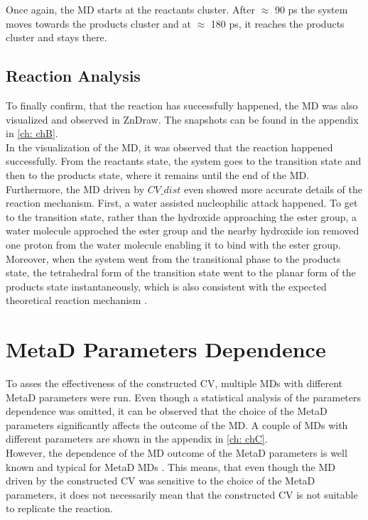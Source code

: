 Once again, the MD starts at the reactants cluster.
After $\approx$ 90 ps the system moves towards the products cluster and at $\approx$ 180 ps, it reaches the products cluster and stays there.

\subsection{Reaction Analysis}
To finally confirm, that the reaction has successfully happened, the MD was also visualized and observed in ZnDraw.
The snapshots can be found in the appendix in \cref{ch: chB}. \\

In the visualization of the MD, it was observed that the reaction happened successfully.
From the reactants state, the system goes to the transition state and then to the products state, where it remains until the end of the MD.
Furthermore, the MD driven by $CV\_dist$ even showed more accurate details of the reaction mechanism.
First, a water assisted nucleophilic attack happened. To get to the transition state, rather than the hydroxide approaching the ester group, 
a water molecule approched the ester group and the nearby hydroxide ion removed one proton from the water molecule enabling it to bind with the ester group.
Moreover, when the system went from the transitional phase to the products state, the tetrahedral form of the transition state went to the planar form of the products state instantaneously, which is also consistent with the expected theoretical reaction mechanism \cite{Clayden2012}.

\newpage

\section{MetaD Parameters Dependence}

To asses the effectiveness of the constructed CV, multiple MDs with different MetaD parameters were run.
Even though a statistical analysis of the parameters dependence was omitted, it can be observed that the choice of the MetaD parameters significantly affects the outcome of the MD.
A couple of MDs with different parameters are shown in the appendix in \cref{ch: chC}. \\
However, the dependence of the MD outcome of the MetaD parameters is well known and typical for MetaD MDs \cite{Laio2008}.
This means, that even though the MD driven by the constructed CV was sensitive to the choice of the MetaD parameters, it does not necessarily mean that the constructed CV is not suitable to replicate the reaction.




